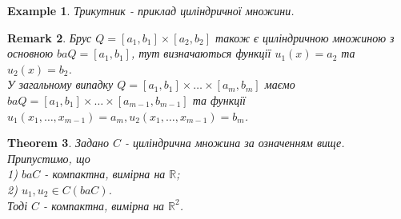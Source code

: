 \documentclass[a4paper, 10pt]{article}
\theoremstyle{theoremdd}
\newtheorem{theorem}{Theorem}[subsection]
\theoremstyle{theoremdd}
\theoremstyle{theoremdd}
\theoremstyle{theoremdd}
\newtheorem{example}[theorem]{Example}
\theoremstyle{theoremdd}
\theoremstyle{theoremdd}
\newtheorem{remark}[theorem]{Remark}
\theoremstyle{theoremdd}
\theoremstyle{theoremdd}
\begin{document}
\begin{example}
Трикутник - приклад циліндричної множини.
\end{example}

\begin{remark}
Брус $Q = [a_1,b_1] \times [a_2,b_2]$ також є циліндричною множиною з основною $baQ = [a_1,b_1]$, тут визначаються функції $u_1(x) = a_2$ та $u_2(x) = b_2$.\\
У загальному випадку $Q = [a_1,b_1] \times \dots \times [a_m,b_m]$ маємо $baQ = [a_1,b_1] \times \dots \times [a_{m-1},b_{m-1}]$ та функції $u_1(x_1,\dots,x_{m-1}) = a_m, u_2(x_1,\dots,x_{m-1}) = b_m$.
\end{remark}

\begin{theorem}
Задано $C$ - циліндрична множина за означенням вище. Припустимо, що\\
1) $ba C$ - компактна, вимірна на $\mathbb{R}$;\\
2) $u_1,u_2 \in C(ba C)$.\\
Тоді $C$ - компактна, вимірна на $\mathbb{R}^2$.
\end{theorem}
\end{document}
